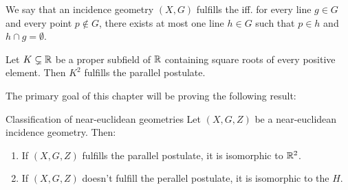 \begin{definition}
	We say that an incidence geometry $(X,G)$ fulfills the  iff. for every line $g \in G$ and every point $p \notin G$, there exists at most one line $h \in G$ such that $p \in h$ and $h \cap g = \emptyset$.
\end{definition}
\begin{exercise}
	Let $K \subsetneq \mathbb{R}$ be a proper subfield of $\mathbb{R}$ containing square roots of every positive element. Then $K^2$ fulfills the parallel postulate.
\end{exercise}
The primary goal of this chapter will be proving the following result:
\begin{importanttheorem}{Classification of near-euclidean geometries}{}
	Let $(X,G,Z)$ be a near-euclidean incidence geometry. Then:
	\begin{enumerate}
		\item If $(X,G,Z)$ fulfills the parallel postulate, it is isomorphic to $\mathbb{R}^2$.
		\item If $(X,G,Z)$ doesn't fulfill the perallel postulate, it is isomorphic to the  $H$.
	\end{enumerate}
\end{importanttheorem}
